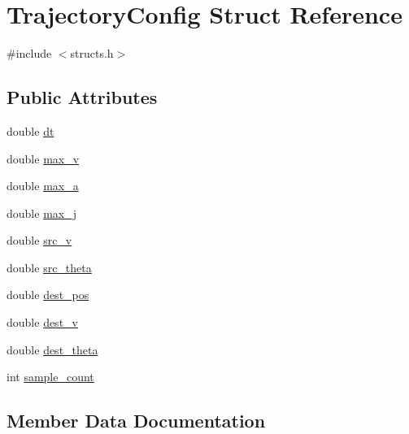 \hypertarget{structTrajectoryConfig}{}\section{Trajectory\+Config Struct Reference}
\label{structTrajectoryConfig}


{\ttfamily \#include $<$structs.\+h$>$}

\subsection*{Public Attributes}
\begin{DoxyCompactItemize}
\item 
double \mbox{\hyperlink{structTrajectoryConfig_ac633cbdf6bba0f65b4d7f2ae188276c2}{dt}}
\item 
double \mbox{\hyperlink{structTrajectoryConfig_aa46fe187d77d5d441c9a8ba3c4932f60}{max\+\_\+v}}
\item 
double \mbox{\hyperlink{structTrajectoryConfig_a78401d5f3320ea8fa8a92a6edd45a356}{max\+\_\+a}}
\item 
double \mbox{\hyperlink{structTrajectoryConfig_ae709c6873708ff4bcc6312d37ebb0fd8}{max\+\_\+j}}
\item 
double \mbox{\hyperlink{structTrajectoryConfig_a6350795bedbffc330f883fb5e7eafbf2}{src\+\_\+v}}
\item 
double \mbox{\hyperlink{structTrajectoryConfig_a71fba6c7ea0528f1c3a63c1d381d9f16}{src\+\_\+theta}}
\item 
double \mbox{\hyperlink{structTrajectoryConfig_a57862496627e03a3e4c25d6b6f784568}{dest\+\_\+pos}}
\item 
double \mbox{\hyperlink{structTrajectoryConfig_a8c8545a396aaeeb5fd262d513c9805ae}{dest\+\_\+v}}
\item 
double \mbox{\hyperlink{structTrajectoryConfig_a977ecd1681acbad6f5185ca41805a704}{dest\+\_\+theta}}
\item 
int \mbox{\hyperlink{structTrajectoryConfig_a6ae4157adc803e4d71c063b16cc50262}{sample\+\_\+count}}
\end{DoxyCompactItemize}


\subsection{Member Data Documentation}
\mbox{\label{structTrajectoryConfig_a57862496627e03a3e4c25d6b6f784568}} 
